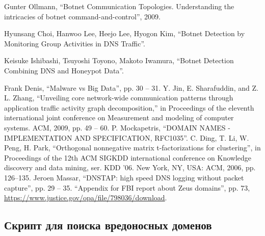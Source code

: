 \documentclass[a4paper,14pt]{extreport} %
\begin{document}
\begin{thebibliography}{99}

		
	 Gunter Ollmann, ``Botnet Communication Topologies. Understanding the intricacies of botnet command-and-control'', 2009.
		
	 Hyunsang Choi, Hanwoo Lee, Heejo Lee, Hyogon Kim, ``Botnet Detection by Monitoring Group Activities in
	DNS Traffic''.
		
	 Keisuke Ishibashi, Tsuyoshi Toyono, Makoto Iwamura, ``Botnet Detection Combining DNS and Honeypot Data''.
		
	 Frank Denis, ``Malware vs Big Data'', pp. 30 -- 31.
	 Y. Jin, E. Sharafuddin, and Z. L. Zhang, “Unveiling core network-wide communication patterns through application traffic activity graph decomposition,” in Proceedings of the eleventh international joint conference on Measurement and modeling of computer systems. ACM, 2009, pp. 49 -- 60.
	  P. Mockapetris, ``DOMAIN NAMES - IMPLEMENTATION AND SPECIFICATION, RFC1035''.
	 C. Ding, T. Li, W. Peng, H. Park, ``Orthogonal nonnegative matrix t-factorizations for clustering'', in Proceedings of the 12th ACM SIGKDD
	international conference on Knowledge discovery and data mining, ser.
	KDD ’06. New York, NY, USA: ACM, 2006, pp. 126–135.
	 Jeroen Massar, ``DNSTAP: high speed DNS logging without packet capture'', pp. 29 -- 35.
	 ``Appendix for FBI report about Zeus domains'', pp. 73, \url{https://www.justice.gov/opa/file/798036/download}.
\end{thebibliography}

\begin{appendices}
	\chapter{Скрипт для поиска вредоносных доменов}
	\label{appendix:code}
	
\end{appendices}
\end{document}
